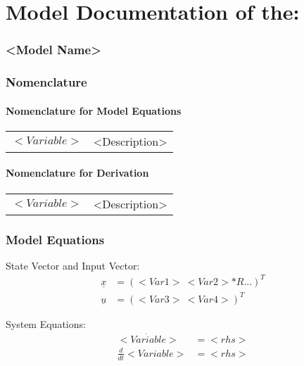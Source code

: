 \documentclass[10pt,a4paper]{article}
\begin{document}
	\part*{Model Documentation of the:}
	\section*{<Model Name>} %
	
	
	\section{Nomenclature} %
	\subsection{Nomenclature for Model Equations} %
	
	\begin{tabular}{ll}
		$<Variable>$ & <Description>		
	\end{tabular}
	
	\subsection{Nomenclature for Derivation} %
	
	\begin{tabular}{ll}
		$<Variable>$ & <Description>
	\end{tabular}
	
	
	\section{Model Equations} %
	
	State Vector and Input Vector:
	\begin{align*}
		\underline{x} &= (<Var1> \ <Var2>*R ...)^T \\
		\underline{u} &= (<Var3> \ <Var4>)^T
	\end{align*}

	\noindent System Equations:		
	\begin{subequations}
	\begin{align}
		\dot{<Variable>} &= <rhs> 	\\      %
		\frac{d}{dt} <Variable> &= <rhs> 
	\end{align}
	\end{subequations}
\end{document}
